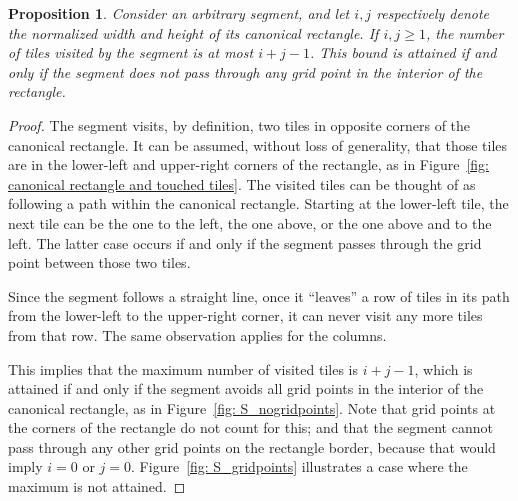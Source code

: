 \documentclass[12pt, a4paper]{article}
\newcommand{\touch}{visit}
\newcommand{\touches}{visits}
\newcommand{\touched}{visited}
\newtheorem{proposition}{Proposition}%
\begin{document}
\begin{proposition}
\label{prop: i+j-1}
Consider an arbitrary segment, and let $i, j$ respectively denote the normalized width and height of its canonical rectangle. If $i, j \geq 1$, the number of tiles \touched{} by the segment is at most $i+j-1$. This bound is attained if and only if the segment does not pass through any grid point in the interior of the rectangle.
\end{proposition}

\begin{proof}
The segment \touches{}, by definition, two tiles in opposite corners of the canonical rectangle. It can be assumed, without loss of generality, that those tiles are in the lower-left and upper-right corners of the rectangle, as in Figure~\ref{fig: canonical rectangle and touched tiles}. The \touched{} tiles can be thought of as following a path within the canonical rectangle. Starting at the lower-left tile, the next tile can be the one to the left, the one above, or the one above and to the left. The latter case occurs if and only if the segment passes through the grid point between those two tiles.

Since the segment follows a straight line, once it ``leaves'' a row of tiles in its path from the lower-left to the upper-right corner, it can never \touch{} any more tiles from that row. The same observation applies for the columns.

This implies that the maximum number of \touched{} tiles is $i+j-1$, which is attained if and only if the segment avoids all grid points in the interior of the canonical rectangle, as in Figure~\ref{fig: S_nogridpoints}. Note that grid points at the corners of the rectangle do not count for this; and that the segment cannot pass through any other grid points on the rectangle border, because that would imply $i=0$ or $j=0$. Figure~\ref{fig: S_gridpoints} illustrates a case where the maximum is not attained.
\end{proof}
\end{document}
